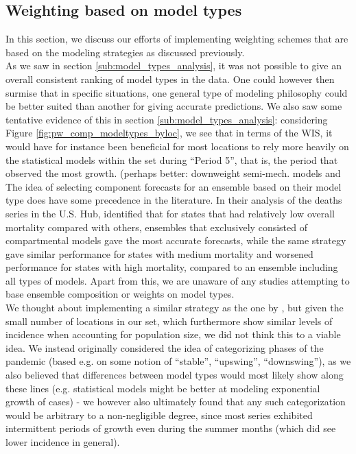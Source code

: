 \subsection{Weighting based on model types} \label{sub:weighting_based_on_model_types}
In this section, we discuss our efforts of implementing weighting schemes that are based on the modeling strategies as discussed previously.\\
As we saw in section \ref{sub:model_types_analysis}, it was not possible to give an overall consistent ranking of model types in the data. One could however then surmise that in specific situations, one general type of modeling philosophy could be better suited than another for giving accurate predictions. We also saw some tentative evidence of this in section \ref{sub:model_types_analysis}: considering Figure \ref{fig:pw_comp_modeltypes_byloc}, we see that in terms of the WIS, it would have for instance been beneficial for most locations to rely more heavily on the statistical models within the set during ``Period 5'', that is, the period that observed the most growth. (perhaps better: downweight semi-mech. models and \\
The idea of selecting component forecasts for an ensemble based on their model type does have some precedence in the literature. In their analysis of the deaths series in the U.S. Hub, \cite{taylor_combining_2021} identified that for states that had relatively low overall mortality compared with others, ensembles that exclusively consisted of compartmental models gave the most accurate forecasts, while the same strategy gave similar performance for states with medium mortality and worsened performance for states with high mortality, compared to an ensemble including all types of models. Apart from this, we are unaware of any studies attempting to base ensemble composition or weights on model types.\\
We thought about implementing a similar strategy as the one by \cite{taylor_combining_2021}, but given the small number of locations in our set, which furthermore show similar levels of incidence when accounting for population size, we did not think this to a viable idea. We instead originally considered the idea of categorizing phases of the pandemic (based e.g. on some notion of ``stable'', ``upswing'', ``downswing''), as we also believed that differences between model types would most likely show along these lines (e.g. statistical models might be better at modeling exponential growth of cases) - we however also ultimately found that any such categorization would be arbitrary to a non-negligible degree, since most series exhibited intermittent periods of growth even during the summer months (which did see lower incidence in general).\\
